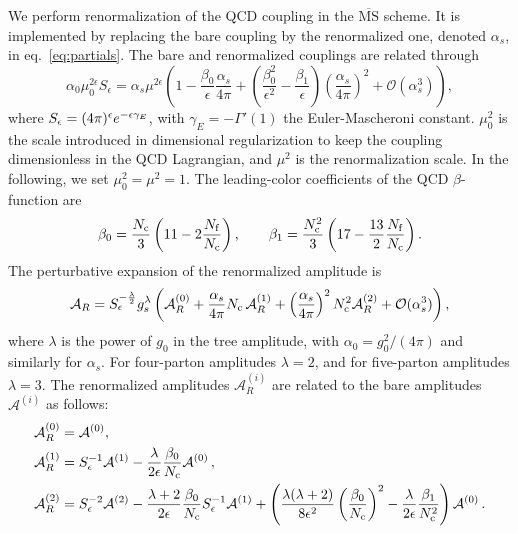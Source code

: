 We perform renormalization of the QCD coupling in the 
$\overline{\text{MS}}$ scheme. It is implemented by replacing 
the bare coupling by the renormalized one, denoted $\alpha_s$, 
in eq.~\eqref{eq:partials}.
The bare and renormalized couplings are related through
\begin{equation}\label{eq:renormCoupling}
    \alpha_0\mu_0^{2\epsilon}S_{\epsilon}
  =\alpha_s\mu^{2\epsilon}\left(
  1-\frac{\beta_0}{\epsilon}\frac{\alpha_s}{4\pi}
  +\left(\frac{\beta_0^2}{\epsilon^2}-\frac{\beta_1}{\epsilon}\right)
  \left(\frac{\alpha_s}{4\pi}\right)^2+\mathcal{O}
  \left(\alpha_s^3\right)\right),
\end{equation}
where $S_\epsilon=(4\pi)^{\epsilon}e^{-\epsilon\gamma_E}$, with
$\gamma_E=-\Gamma'(1)$ the Euler-Mascheroni constant.
$\mu_0^2$ is the scale introduced in dimensional regularization
to keep the coupling dimensionless in the QCD Lagrangian, 
and $\mu^2$ is the renormalization scale. In the following, we
set $\mu_0^2=\mu^2=1$. The leading-color coefficients of the QCD
$\beta$-function are
\begin{equation}
  \beta_0=\frac{N_\mathrm{c}}{3} \left( 11 - 2\frac{N_\mathrm{f}}{N_\mathrm{c}}
  \right),\qquad
  \beta_1=\frac{N_\mathrm{c}^2}{3} \left( 17 - \frac{13}{2} \frac{N_\mathrm{f}}{N_\mathrm{c}} \right).
\end{equation}
The perturbative expansion of the renormalized amplitude is
\begin{equation}\label{eq:renormAmp}
  \mathcal{A}_R = S_\epsilon^{-\frac{\lambda}{2}}
  g_s^\lambda\left(
  \mathcal{A}_R^{(0)}
  +\frac{\alpha_s}{4\pi}N_\mathrm{c}\,\mathcal{A}_R^{(1)}
  +\left(\frac{\alpha_s}{4\pi}\right)^2N_\mathrm{c}^2\mathcal{A}_R^{(2)}
  +\mathcal{O}(\alpha_s^3)
  \right),
\end{equation}
where $\lambda$ is the power of $g_0$ in the tree amplitude, 
with $\alpha_0=g_0^2/(4\pi)$ and similarly for $\alpha_s$.
For four-parton amplitudes $\lambda=2$, and for five-parton 
amplitudes $\lambda=3$.
The renormalized amplitudes $\mathcal{A}_R^{(i)}$ are related 
to the bare amplitudes $\mathcal{A}^{(i)}$ as follows:
\begin{align}
  \begin{split}
    \label{eq:twoLoopUnRenorm}
    &\mathcal{A}_R^{(0)}=\mathcal{A}^{(0)}, \\
    & \mathcal{A}_R^{(1)}=S_{\epsilon}^{-1}\mathcal{A}^{(1)}
    -\frac{\lambda}{2\epsilon}\frac{\beta_0}{N_\mathrm{c}}
    \mathcal{A}^{(0)}\,,\\
    &\mathcal{A}_R^{(2)}=
    S_{\epsilon}^{-2}\mathcal{A}^{(2)}
    -\frac{\lambda+2}{2\epsilon}\frac{\beta_0}{N_\mathrm{c}}S_{\epsilon}^
    {-1}
    \mathcal{A}^{(1)}
    +\left(\frac{\lambda(\lambda+2)}{8\epsilon^2}\left(\frac{\beta_0}
    {N_\mathrm{c}}\right)^2
    -\frac{\lambda}{2\epsilon}\frac{\beta_1}{N_\mathrm{c}^2}\right)
    \mathcal{A}^{
    (0)}\,.
  \end{split}
\end{align}



